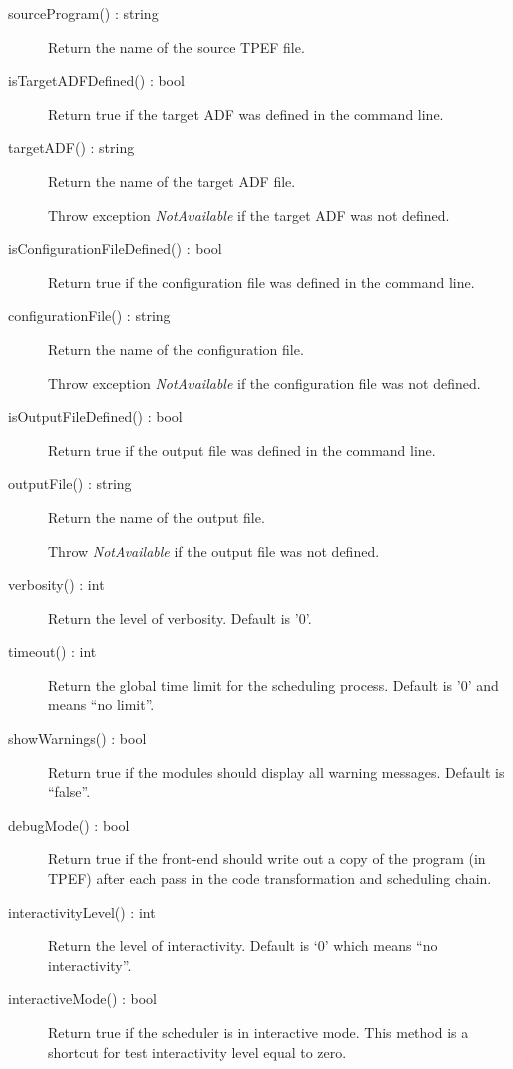 \documentclass[a4paper,twoside]{tce}
\begin{document}
\begin{description}

\item[sourceProgram() : string]
  Return the name of the source TPEF file.

\item[isTargetADFDefined() : bool]
  Return true if the target ADF was defined in the command line.

\item[targetADF() : string]
  Return the name of the target ADF file.

  Throw exception \emph{NotAvailable} if the target ADF was not defined.

\item[isConfigurationFileDefined() : bool]
  Return true if the configuration file was defined in the command line.

\item[configurationFile() : string]
  Return the name of the configuration file.

  Throw exception \emph{NotAvailable} if the configuration file was not
  defined.

\item[isOutputFileDefined() : bool]
  Return true if the output file was defined in the command line.

\item[outputFile() : string]
  Return the name of the output file.

  Throw \emph{NotAvailable} if the output file was not defined.

\item[verbosity() : int]
  Return the level of verbosity. Default is '0'.

\item[timeout() : int]
  Return the global time limit for the scheduling process. Default is
  '0' and means ``no limit''.

\item[showWarnings() : bool]
  Return true if the modules should display all warning
  messages. Default is ``false''.

\item[debugMode() : bool]
  Return true if the front-end should write out a copy of the program
  (in TPEF) after each pass in the code transformation and scheduling chain.

\item[interactivityLevel() : int]
  Return the level of interactivity. Default is `0' which means ``no
  interactivity''.

\item[interactiveMode() : bool]
  Return true if the scheduler is in interactive mode. This method is a
  shortcut for test interactivity level equal to zero.

\end{description}
\end{document}
